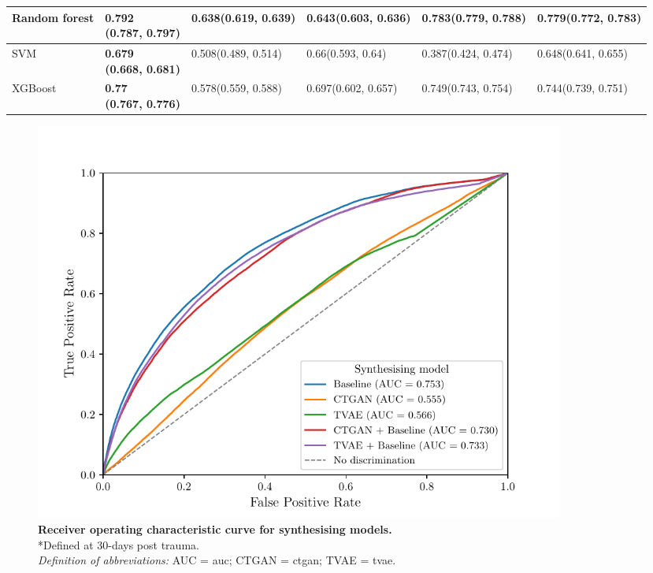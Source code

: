 \documentclass[12pt, a4paper]{article}
\begin{document}
\begin{table}[ht!]
{\begin{tabular}{lP{3cm}P{3cm}P{3cm}P{3cm}P{3cm}}
            Random forest       & \textbf{0.792\newline(0.787, 0.797)} & 0.638\newline(0.619, 0.639) & 0.643\newline(0.603, 0.636) & 0.783\newline(0.779, 0.788)          & 0.779\newline(0.772, 0.783) \\\hline
            SVM                 & \textbf{0.679\newline(0.668, 0.681)} & 0.508\newline(0.489, 0.514) & 0.66\newline(0.593, 0.64)   & 0.387\newline(0.424, 0.474)          & 0.648\newline(0.641, 0.655) \\\hline
            XGBoost             & \textbf{0.77\newline(0.767, 0.776)}  & 0.578\newline(0.559, 0.588) & 0.697\newline(0.602, 0.657) & 0.749\newline(0.743, 0.754)          & 0.744\newline(0.739, 0.751) \\
            \bottomrule
        \end{tabular}
    }
\end{table}

\begin{figure}[ht!]
    \centering
    \includegraphics[width=0.85\textwidth]{figures/roc.pdf}
    \caption{\textbf{Receiver operating characteristic curve for synthesising models.}\\
        *Defined at 30-days post trauma.\\
        \textit{Definition of abbreviations:} AUC = \Acrlong{auc}; CTGAN = \Acrlong{ctgan}; TVAE = \Acrlong{tvae}.}
    \label{fig:flowchart}
\end{figure}
\end{document}
